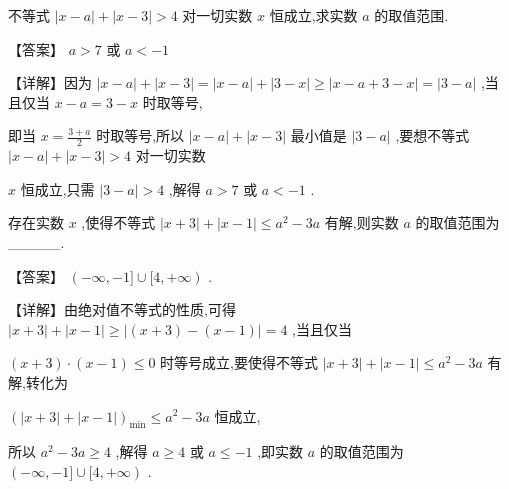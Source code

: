 \documentclass[11pt,a4paper]{article}
\begin{document}
\begin{problem} 
不等式 \(\displaystyle \left| {x - a}\right|  + \left| {x - 3}\right|  > 4\) 对一切实数 \(\displaystyle x\) 恒成立,求实数 \(\displaystyle a\) 的取值范围.
\begin{jiexi}
【答案】 \(\displaystyle a > 7\) 或 \(\displaystyle a <  - 1\)

【详解】因为 \(\displaystyle \left| {x - a}\right|  + \left| {x - 3}\right|  = \left| {x - a}\right|  + \left| {3 - x}\right|  \geq  \left| {x - a + 3 - x}\right|  = \left| {3 - a}\right|\) ,当且仅当 \(\displaystyle x - a = 3 - x\) 时取等号,

即当 \(\displaystyle x = \frac{3 + a}{2}\) 时取等号,所以 \(\displaystyle \left| {x - a}\right|  + \left| {x - 3}\right|\) 最小值是 \(\displaystyle \left| {3 - a}\right|\) ,要想不等式 \(\displaystyle \left| {x - a}\right|  + \left| {x - 3}\right|  > 4\) 对一切实数

\(\displaystyle x\) 恒成立,只需 \(\displaystyle \left| {3 - a}\right|  > 4\) ,解得 \(\displaystyle a > 7\) 或 \(\displaystyle a <  - 1\) .


\end{jiexi}
\end{problem}
\begin{problem} 
存在实数 \(\displaystyle x\) ,使得不等式 \(\displaystyle \left| {x + 3}\right|  + \left| {x - 1}\right|  \leq  {a}^{2} - {3a}\) 有解,则实数 \(\displaystyle a\) 的取值范围为\_\_\_\_\_.
\begin{jiexi}
【答案】 \(\displaystyle \left( {-\infty , - 1\rbrack \cup \lbrack 4, + \infty }\right)\) .

【详解】由绝对值不等式的性质,可得 \(\displaystyle \left| {x + 3}\right|  + \left| {x - 1}\right|  \geq  \left| {\left( {x + 3}\right)  - \left( {x - 1}\right) }\right|  = 4\) ,当且仅当

\(\displaystyle \left( {x + 3}\right)  \cdot  \left( {x - 1}\right)  \leq  0\) 时等号成立,要使得不等式 \(\displaystyle \left| {x + 3}\right|  + \left| {x - 1}\right|  \leq  {a}^{2} - {3a}\) 有解,转化为

\(\displaystyle {\left( \left| x + 3\right|  + \left| x - 1\right| \right) }_{\min } \leq  {a}^{2} - {3a}\) 恒成立,

所以 \(\displaystyle {a}^{2} - {3a} \geq  4\) ,解得 \(\displaystyle a \geq  4\) 或 \(\displaystyle a \leq   - 1\) ,即实数 \(\displaystyle a\) 的取值范围为 \(\displaystyle \left( {-\infty , - 1\rbrack \cup \lbrack 4, + \infty }\right)\) .


\end{jiexi}
\end{problem}
\end{document}
